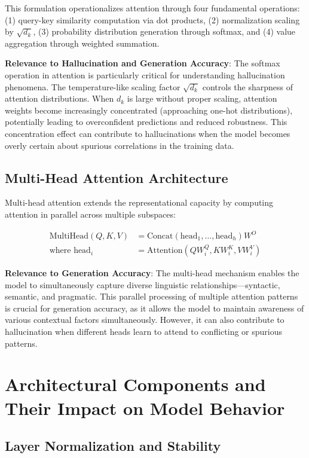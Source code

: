 This formulation operationalizes attention through four fundamental operations: (1) query-key similarity computation via dot products, (2) normalization scaling by $\sqrt{d_k}$, (3) probability distribution generation through softmax, and (4) value aggregation through weighted summation.

\textbf{Relevance to Hallucination and Generation Accuracy}: The softmax operation in attention is particularly critical for understanding hallucination phenomena. The temperature-like scaling factor $\sqrt{d_k}$ controls the sharpness of attention distributions. When $d_k$ is large without proper scaling, attention weights become increasingly concentrated (approaching one-hot distributions), potentially leading to overconfident predictions and reduced robustness. This concentration effect can contribute to hallucinations when the model becomes overly certain about spurious correlations in the training data.

\subsection{Multi-Head Attention Architecture}

Multi-head attention extends the representational capacity by computing attention in parallel across multiple subspaces:

\begin{align}
\text{MultiHead}(Q, K, V) &= \text{Concat}(\text{head}_1, \ldots, \text{head}_h)W^O \\
\text{where } \text{head}_i &= \text{Attention}(QW_i^Q, KW_i^K, VW_i^V)
\end{align}

\textbf{Relevance to Generation Accuracy}: The multi-head mechanism enables the model to simultaneously capture diverse linguistic relationships—syntactic, semantic, and pragmatic. This parallel processing of multiple attention patterns is crucial for generation accuracy, as it allows the model to maintain awareness of various contextual factors simultaneously. However, it can also contribute to hallucination when different heads learn to attend to conflicting or spurious patterns.

\section{Architectural Components and Their Impact on Model Behavior}

\subsection{Layer Normalization and Stability}

